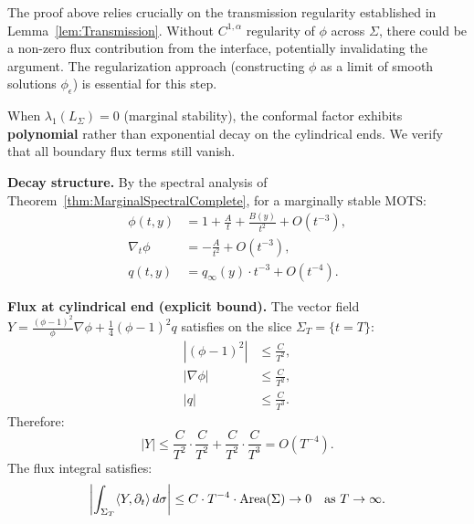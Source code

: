 \begin{remark}
The proof above relies crucially on the transmission regularity established in Lemma~\ref{lem:Transmission}. Without $C^{1,\alpha}$ regularity of $\phi$ across $\Sigma$, there could be a non-zero flux contribution from the interface, potentially invalidating the argument. The regularization approach (constructing $\phi$ as a limit of smooth solutions $\phi_\epsilon$) is essential for this step.
\end{remark}

\begin{remark}\label{rem:PolynomialDecayFlux}
When $\lambda_1(L_\Sigma) = 0$ (marginal stability), the conformal factor exhibits \textbf{polynomial} rather than exponential decay on the cylindrical ends. We verify that all boundary flux terms still vanish.

\textbf{Decay structure.} By the spectral analysis of Theorem~\ref{thm:MarginalSpectralComplete}, for a marginally stable MOTS:
\begin{align}
    \phi(t, y) &= 1 + \frac{A}{t} + \frac{B(y)}{t^2} + O(t^{-3}), \\
    \nabla_t \phi &= -\frac{A}{t^2} + O(t^{-3}), \\
    q(t, y) &= q_\infty(y) \cdot t^{-3} + O(t^{-4}).
\end{align}

\textbf{Flux at cylindrical end (explicit bound).} The vector field $Y = \frac{(\phi-1)^2}{\phi}\nabla\phi + \frac{1}{4}(\phi-1)^2 q$ satisfies on the slice $\Sigma_T = \{t = T\}$:
\begin{align}
    |(\phi-1)^2| &\le \frac{C}{T^2}, \\
    |\nabla\phi| &\le \frac{C}{T^2}, \\
    |q| &\le \frac{C}{T^3}.
\end{align}
Therefore:
\begin{equation}
    |Y| \le \frac{C}{T^2} \cdot \frac{C}{T^2} + \frac{C}{T^2} \cdot \frac{C}{T^3} = O(T^{-4}).
\end{equation}
The flux integral satisfies:
\begin{equation}
    \left| \int_{\Sigma_T} \langle Y, \partial_t \rangle \, d\sigma \right| \le C \cdot T^{-4} \cdot \operatorname{Area}(\Sigma) \to 0 \quad \text{as } T \to \infty.
\end{equation}


\end{remark}
